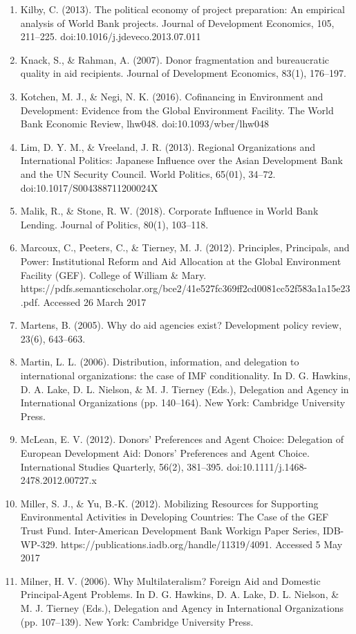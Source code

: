 \documentclass{article}
\begin{document}
\begin{singlespace}
\begin{enumerate}
	\item Kilby, C. (2013). The political economy of project preparation: An empirical analysis of World Bank projects. Journal of Development Economics, 105, 211–225. doi:10.1016/j.jdeveco.2013.07.011
	\item Knack, S., \& Rahman, A. (2007). Donor fragmentation and bureaucratic quality in aid recipients. Journal of Development Economics, 83(1), 176–197.
	\item Kotchen, M. J., \& Negi, N. K. (2016). Cofinancing in Environment and Development: Evidence from the Global Environment Facility. The World Bank Economic Review, lhw048. doi:10.1093/wber/lhw048
	\item Lim, D. Y. M., \& Vreeland, J. R. (2013). Regional Organizations and International Politics: Japanese Influence over the Asian Development Bank and the UN Security Council. World Politics, 65(01), 34–72. doi:10.1017/S004388711200024X
	\item Malik, R., \& Stone, R. W. (2018). Corporate Influence in World Bank Lending. Journal of Politics, 80(1), 103–118.
	\item Marcoux, C., Peeters, C., \& Tierney, M. J. (2012). Principles, Principals, and Power: Institutional Reform and Aid Allocation at the Global Environment Facility (GEF). College of William \& Mary. https://pdfs.semanticscholar.org/bce2/41e527fc369ff2cd0081cc52f583a1a15e23.pdf. Accessed 26 March 2017
	\item Martens, B. (2005). Why do aid agencies exist? Development policy review, 23(6), 643–663.
	\item Martin, L. L. (2006). Distribution, information, and delegation to international organizations: the case of IMF conditionality. In D. G. Hawkins, D. A. Lake, D. L. Nielson, \& M. J. Tierney (Eds.), Delegation and Agency in International Organizations (pp. 140–164). New York: Cambridge University Press.
	\item McLean, E. V. (2012). Donors’ Preferences and Agent Choice: Delegation of European Development Aid: Donors’ Preferences and Agent Choice. International Studies Quarterly, 56(2), 381–395. doi:10.1111/j.1468-2478.2012.00727.x
	\item Miller, S. J., \& Yu, B.-K. (2012). Mobilizing Resources for Supporting Environmental Activities in Developing Countries: The Case of the GEF Trust Fund. Inter-American Development Bank Workign Paper Series, IDB-WP-329. https://publications.iadb.org/handle/11319/4091. Accessed 5 May 2017
	\item Milner, H. V. (2006). Why Multilateralism? Foreign Aid and Domestic Principal-Agent Problems. In D. G. Hawkins, D. A. Lake, D. L. Nielson, \& M. J. Tierney (Eds.), Delegation and Agency in International Organizations (pp. 107–139). New York: Cambridge University Press.

\end{enumerate}
\end{singlespace}
\end{document}
